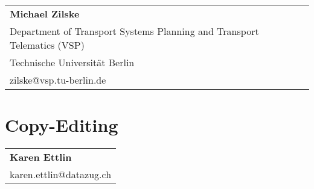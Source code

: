 \begin{tabular}[width=0.48\textwidth]{@{}l}
\textbf{Michael Zilske} \\
Department of Transport Systems Planning and Transport Telematics (VSP) \\
Technische Universität Berlin \\
zilske@vsp.tu-berlin.de \\
\end{tabular}

\section*{Copy-Editing}

\begin{tabular}[width=0.48\textwidth]{@{}l}
\textbf{Karen Ettlin} \\
karen.ettlin@datazug.ch \\
\end{tabular}



